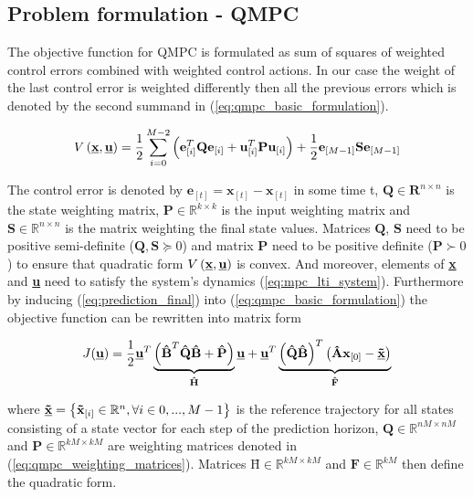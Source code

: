 \subsection{Problem formulation - QMPC}


The objective function for QMPC is formulated as sum of squares of weighted control errors combined with weighted control actions. In our case the weight of the last control error is weighted differently then all the previous errors which is denoted by the second summand in (\ref{eq:qmpc_basic_formulation}).

\begin{equation}
\label{eq:qmpc_basic_formulation}
V\left(\textbf{\underline{x}}, \textbf{\underline{u}}\right) = \frac{1}{2}\sum_{i=0}^{M-2}\left(\textbf{e}^T_{[i]}\textbf{Q}\textbf{e}_{[i]} + \textbf{u}^T_{[i]}\textbf{P}\textbf{u}_{[i]}\right) + \frac{1}{2}\textbf{e}_{[M-1]}\textbf{S}\textbf{e}_{[M-1]}
\end{equation}

The control error is denoted by $\textbf{e}_{[t]} = \textbf{x}_{[t]} - \textbf{\~x}_{[t]}$ in some time t, $\textbf{Q} \in \textbf{R}^{n\times n}$ is the state weighting matrix, $\textbf{P} \in \mathbb{R}^{k\times k}$ is the input weighting matrix and $\textbf{S} \in \mathbb{R}^{n \times n}$ is the matrix weighting the final state values. Matrices $\textbf{Q}$, $\textbf{S}$ need to be positive semi-definite ($\textbf{Q}, \textbf{S} \succeq 0$) and matrix $\textbf{P}$ need to be positive definite ($\textbf{P} \succ 0$) to ensure that quadratic form $V\left(\textbf{\underline{x}}, \textbf{\underline{u}}\right)$ is convex. And moreover, elements of \textbf{\underline{x}} and \textbf{\underline{u}} need to satisfy the system's dynamics (\ref{eq:mpc_lti_system}). Furthermore by inducing (\ref{eq:prediction_final}) into (\ref{eq:qmpc_basic_formulation}) the objective function can be rewritten into matrix form


\begin{equation}
J(\underline{\textbf{u}}) = \frac{1}{2}\textbf{\underline{u}}^T\underbrace{\left(\textbf{\^B}^T\textbf{\^Q}\textbf{\^B} + \textbf{\^P}\right)}_{\textbf{\^H}}\textbf{\underline{u}} + \textbf{\underline{u}}^T\underbrace{\left(\textbf{\^Q}\textbf{\^B}\right)^T\left(\textbf{\^A}\textbf{x}_{[0]} - \textbf{\underline{\~x}}\right)}_{\textbf{\^F}}
\end{equation}

where $\textbf{\underline{\~x}} = \left\lbrace \textbf{\~x}_{[i]} \in \mathbb{R}^n, \forall i \in 0, ..., M-1 \right\rbrace$ is the reference trajectory for all states consisting of a state vector for each step of the prediction horizon, \mbox{$\textbf{\^Q} \in \mathbb{R}^{nM \times nM}$} and $\textbf{\^P} \in \mathbb{R}^{kM\times kM}$ are weighting matrices denoted in (\ref{eq:qmpc_weighting_matrices}). Matrices $\textbf{\^H} \in \mathbb{R}^{kM\times kM}$ and $\textbf{\^F} \in \mathbb{R}^{kM}$ then define the quadratic form.

